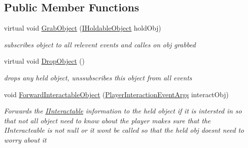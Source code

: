 \subsection*{Public Member Functions}
\begin{DoxyCompactItemize}
\item 
virtual void \mbox{\hyperlink{class_player_hand_a64a86af904a77f4a0b92d72bd5fdf43c}{Grab\+Object}} (\mbox{\hyperlink{interface_i_holdable_object}{I\+Holdable\+Object}} hold\+Obj)
\begin{DoxyCompactList}\small\item\em subscribes object to all relevent events and calles on obj grabbed \end{DoxyCompactList}\item 
virtual void \mbox{\hyperlink{class_player_hand_a3b127b846b420ef37cba3a3a8de68e78}{Drop\+Object}} ()
\begin{DoxyCompactList}\small\item\em drops any held object, unssubscribes this object from all events \end{DoxyCompactList}\item 
void \mbox{\hyperlink{class_player_hand_a67095e4c1db1e3369c435dd1fe1ebec5}{Forward\+Interactable\+Object}} (\mbox{\hyperlink{class_player_interaction_event_args}{Player\+Interaction\+Event\+Args}} interact\+Obj)
\begin{DoxyCompactList}\small\item\em Forwards the \mbox{\hyperlink{interface_i_interactable}{I\+Interactable}} information to the held object if it is intersted in so that not all object need to know about the player makes sure that the I\+Interacteable is not null or it wont be called so that the held obj doesn\textquotesingle{}t need to worry about it \end{DoxyCompactList}\end{DoxyCompactItemize}
